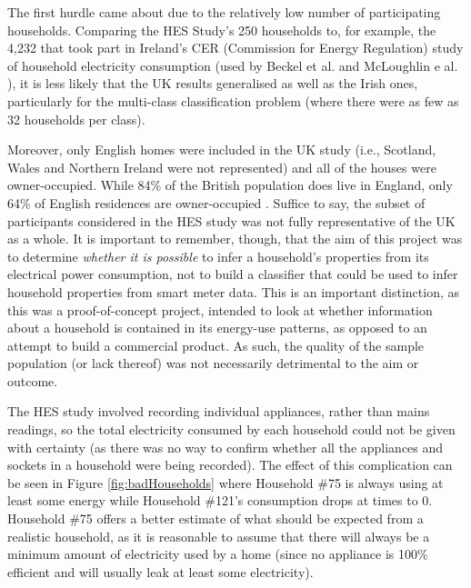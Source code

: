The first hurdle came about due to the relatively low number of participating households. Comparing the HES Study's 250 households to, for example, the 4,232 that took part in Ireland's CER (Commission for Energy Regulation) study of household electricity consumption\cite{ISSDA} (used by  Beckel et al. and McLoughlin e al. \cite{Beckel_1,Beckel_2,Beckel_3,McLoughlin}), it is less likely that the UK results generalised as well as the Irish ones, particularly for the multi-class classification problem (where there were as few as 32 households per class). 

Moreover, only English homes were included in the UK study (i.e., Scotland, Wales and Northern Ireland were not represented) and all of the houses were owner-occupied.  While 84\% of the British population does live in England, only 64\% of English residences are owner-occupied \cite{ONS}. Suffice to say, the subset of participants considered in the HES study was not fully representative of the UK as a whole. It is important to remember, though, that the aim of this project was to determine \textit{whether it is possible} to infer a household's properties from its electrical power consumption, not to build a classifier that could be used to infer household properties from smart meter data. This is an important distinction, as this was a proof-of-concept project, intended to look at whether information about a household is contained in its energy-use patterns, as opposed to an attempt to build a commercial product.  As such, the quality of the sample population (or lack thereof) was not necessarily detrimental to the aim or outcome.

The HES study involved recording individual appliances, rather than mains readings, so the total electricity consumed by each household could not be given with certainty (as there was no way to confirm whether all the appliances and sockets in a household were being recorded). The effect of this complication can be seen in Figure \ref{fig:badHouseholds} where Household \#75 is always using at least some energy while Household \#121's consumption drops at times to 0. Household \#75 offers a better estimate of what should be expected from a realistic household, as it is reasonable to assume that there will always be a minimum amount of electricity used by a home (since no appliance is 100\% efficient and will usually leak at least some electricity).  

